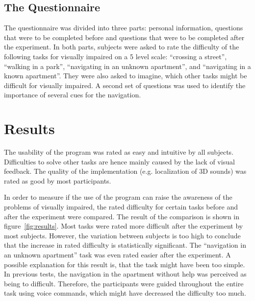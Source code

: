 \documentclass{sig-alternate}
\begin{document}
\subsection{The Questionnaire}

The questionnaire was divided into three parts: personal information, questions
that were to be completed before and questions that were to be completed after
the experiment. In both parts, subjects were asked to rate the difficulty of the
following tasks for visually impaired on a 5 level scale: ``crossing a
street'', ``walking in a park'', ``navigating in an unknown apartment'', and ``navigating in a known
apartment''. They were also asked to imagine, which other tasks might be
difficult for visually impaired. A second set of questions was used to identify
the importance of several cues for the navigation.

\section{Results}
\label{sec:results}

The usability of the program was rated as easy and intuitive by all subjects.
Difficulties to solve other tasks are hence mainly caused by the lack of visual
feedback. The quality of the implementation (e.g. localization of 3D
sounds) was rated as good by most participants.

In order to measure if the use of the program can raise the awareness of the
problems of visually impaired, the rated difficulty for certain tasks before and
after the experiment were compared. The result of the comparison is shown in
figure~\ref{fig:results}. Most tasks were rated more difficult after the
experiment by most subjects. However, the variation between subjects is too high
to conclude that the increase in rated difficulty is statistically significant.
The ``navigation in an unknown apartment'' task was even rated easier after the
experiment. A possible explanation for this result is, that the task might have
been too simple. In previous tests, the navigation in the apartment without help
was perceived as being to difficult. Therefore, the participants were guided
throughout the entire task using voice commands, which might have decreased the
difficulty too much.
\end{document}
